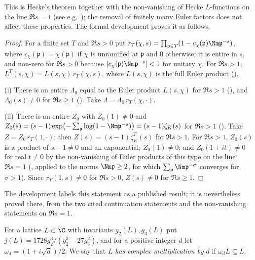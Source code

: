 This is Hecke's theorem \cite{Hecke1917,Hecke1920} together with the non-vanishing of Hecke $L$-functions on the line $\Re s=1$
(see e.g.\ \cite[Ch.~VII]{Neukirch1999}); the removal of finitely many Euler factors does not affect these properties. The formal
development proves it as follows.

\begin{proof}
For a finite set $T$ and $\Re s>0$ put $r_T(\chi,s)=\prod_{\mathfrak p\in T}(1-c_\chi(\mathfrak p)\Nm\mathfrak p^{-s})$, where $c_\chi(\mathfrak p)=\chi(\mathfrak p)$
if $\chi$ is unramified at $\mathfrak p$ and $0$ otherwise; it is entire in $s$, and non-zero for $\Re s>0$ because
$|c_\chi(\mathfrak p)\Nm\mathfrak p^{-s}|<1$ for unitary $\chi$. For $\Re s>1$, $L^T(s,\chi)=L(s,\chi)\,r_T(\chi,s)$, where $L(s,\chi)$ is the full Euler product
().

(i) There is an entire $\Lambda_0$ equal to the Euler product $L(s,\chi)$ for $\Re s>1$
(), and $\Lambda_0(s)\ne0$ for $\Re s\ge1$
(). Take $\Lambda=\Lambda_0\,r_T(\chi,\cdot)$.

(ii) There is an entire $Z_0$ with $Z_0(1)\ne0$ and $Z_0(s)=(s-1)\exp\bigl(-\sum_{\mathfrak p}\log(1-\Nm\mathfrak p^{-s})\bigr)=(s-1)\zeta_K(s)$ for $\Re
s>1$ (). Take $Z=Z_0\,r_T(1,\cdot)$; then
$Z(s)=(s-1)\zeta_K^T(s)$ for $\Re s>1$. For $\Re s>1$, $Z_0(s)$ is a product of $s-1\ne0$ and an exponential; $Z_0(1)\ne0$; and
$Z_0(1+it)\ne0$ for real $t\ne0$ by the non-vanishing of Euler products of this type on the line $\Re s=1$
(, applied to the norms $\Nm\mathfrak p\ge2$, for which
$\sum_{\mathfrak p}\Nm\mathfrak p^{-\sigma}$ converges for $\sigma>1$). Since $r_T(1,s)\ne0$ for $\Re s>0$, $Z(s)\ne0$ for $\Re s\ge1$.
\end{proof}

\begin{remark}\label{pf:sh-misc:heckeLrem}
The development labels this statement as a published result; it is nevertheless proved there, from the two cited continuation statements
and the non-vanishing statements on $\Re s=1$.
\end{remark}

For a lattice $L\subset\C$ with invariants $g_2(L),g_3(L)$ put $j(L)=1728g_2^3/(g_2^3-27g_3^2)$, and for a positive integer $d$ let
$\omega_d=(1+i\sqrt d)/2$. We say that $L$ \emph{has complex multiplication by} $d$ if $\omega_dL\subseteq L$.

